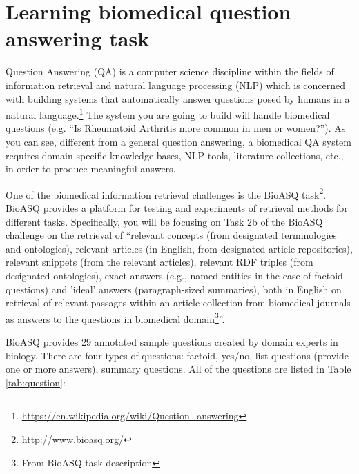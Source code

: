 
\section{Learning biomedical question answering task}

Question Answering (QA) is a computer science discipline within the fields of
information retrieval and natural language processing (NLP) which is concerned
with building systems that automatically answer questions posed by humans in a
natural
language.\footnote{\url{https://en.wikipedia.org/wiki/Question_answering}} The
system you are going to build will handle biomedical questions (e.g. ``Is Rheumatoid Arthritis more common in men or women?''). As you can see, different from a general question answering, a biomedical QA system requires domain specific knowledge bases, NLP tools, literature collections, etc., in order to produce meaningful answers.

One of the biomedical information retrieval challenges is the BioASQ task\footnote{\url{http://www.bioasq.org/}}. BioASQ provides a platform for testing and experiments of retrieval methods for different tasks. Specifically, you will be focusing on Task 2b of the BioASQ challenge on the retrieval of ``relevant concepts (from designated terminologies and ontologies), relevant articles (in English, from designated article repositories), relevant snippets (from the relevant articles), relevant RDF triples (from designated ontologies), exact answers (e.g., named entities in the case of factoid questions) and 'ideal' answers (paragraph-sized summaries), both in English on retrieval of relevant passages within an article collection from biomedical journals as answers to the questions in biomedical domain\footnote{From BioASQ task description}''.

BioASQ provides 29 annotated sample questions created by domain experts in biology. There are four types of questions: factoid, yes/no, list questions (provide one or more answers), summary questions. All of the questions are listed
in Table \ref{tab:question}:

